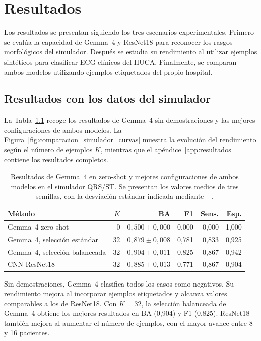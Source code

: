 \chapter{Resultados}
\label{chap:resultados}

Los resultados se presentan siguiendo los tres escenarios experimentales. Primero se evalúa la capacidad de Gemma~4 y ResNet18 para reconocer los rasgos morfológicos del simulador. Después se estudia su rendimiento al utilizar ejemplos sintéticos para clasificar ECG clínicos del HUCA. Finalmente, se comparan ambos modelos utilizando ejemplos etiquetados del propio hospital.

\section{Resultados con los datos del simulador}
\label{chap:comparacion_simulador}

La Tabla~\ref{tab:comparacion_simulador} recoge los resultados de Gemma~4 sin demostraciones y las mejores configuraciones de ambos modelos. La Figura~\ref{fig:comparacion_simulador_curvas} muestra la evolución del rendimiento según el número de ejemplos \(K\), mientras que el apéndice~\ref{app:resultados} contiene los resultados completos.

\begin{table}[H]
  \centering
  \small
  \begin{tabularx}{0.96\textwidth}{Xrrrrr}
    \toprule
    Método & \(K\) & BA & F1 & Sens. & Esp. \\
    \midrule
    Gemma~4 zero-shot & 0 & \(0,500 \pm 0,000\) & 0,000 & 0,000 & 1,000 \\
    Gemma~4, selección estándar & 32 & \(0,879 \pm 0,008\) & 0,781 & 0,833 & 0,925 \\
    Gemma~4, selección balanceada & 32 & \(0,904 \pm 0,011\) & 0,825 & 0,867 & 0,942 \\
    CNN ResNet18 & 32 & \(0,885 \pm 0,013\) & 0,771 & 0,867 & 0,904 \\
    \bottomrule
  \end{tabularx}
  \caption{Resultados de Gemma~4 en zero-shot y mejores configuraciones de ambos modelos en el simulador QRS/ST. Se presentan los valores medios de tres semillas, con la desviación estándar indicada mediante \(\pm\).}
  \label{tab:comparacion_simulador}
  \resultstablenote
\end{table}

Sin demostraciones, Gemma~4 clasifica todos los casos como negativos. Su rendimiento mejora al incorporar ejemplos etiquetados y alcanza valores comparables a los de ResNet18. Con \(K=32\), la selección balanceada de Gemma~4 obtiene los mejores resultados en BA (0,904) y F1 (0,825). ResNet18 también mejora al aumentar el número de ejemplos, con el mayor avance entre 8 y 16 pacientes.

